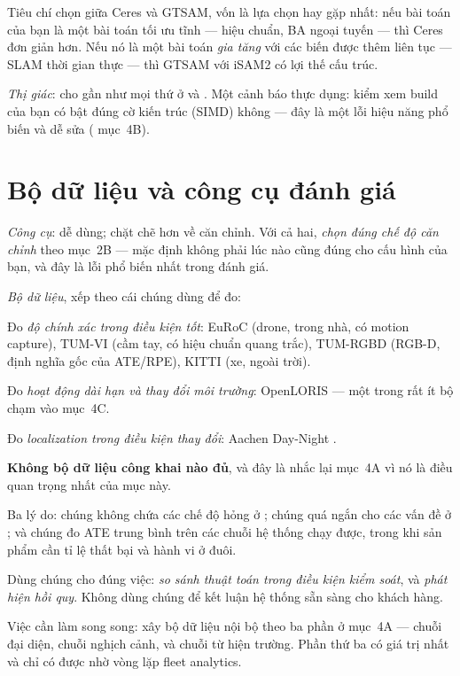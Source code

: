 \documentclass[../../vslam.tex]{subfiles}
\begin{document}
Tiêu chí chọn giữa Ceres và GTSAM, vốn là lựa chọn hay gặp nhất: nếu bài toán của bạn là một bài toán tối ưu tĩnh --- hiệu chuẩn, BA ngoại tuyến --- thì Ceres đơn giản hơn. Nếu nó là một bài toán \emph{gia tăng} với các biến được thêm liên tục --- SLAM thời gian thực --- thì GTSAM với iSAM2 có lợi thế cấu trúc.

\emph{Thị giác}:  cho gần như mọi thứ ở  và . Một cảnh báo thực dụng: kiểm xem build của bạn có bật đúng cờ kiến trúc (SIMD) không --- đây là một lỗi hiệu năng phổ biến và dễ sửa ( mục~4B).

\section{Bộ dữ liệu và công cụ đánh giá}

\emph{Công cụ}:  dễ dùng;  \cite{zhang2018trajeval} chặt chẽ hơn về căn chỉnh. Với cả hai, \emph{chọn đúng chế độ căn chỉnh} theo  mục~2B --- mặc định không phải lúc nào cũng đúng cho cấu hình của bạn, và đây là lỗi phổ biến nhất trong đánh giá.

\emph{Bộ dữ liệu}, xếp theo cái chúng dùng để đo:

Đo \emph{độ chính xác trong điều kiện tốt}: EuRoC \cite{burri2016euroc} (drone, trong nhà, có motion capture), TUM-VI \cite{schubert2018tumvi} (cầm tay, có hiệu chuẩn quang trắc), TUM-RGBD \cite{sturm2012tumrgbd} (RGB-D, định nghĩa gốc của ATE/RPE), KITTI \cite{geiger2012kitti} (xe, ngoài trời).

Đo \emph{hoạt động dài hạn và thay đổi môi trường}: OpenLORIS \cite{shi2020openloris} --- một trong rất ít bộ chạm vào  mục~4C.

Đo \emph{localization trong điều kiện thay đổi}: Aachen Day-Night \cite{sattler2018benchmarking}.

\begin{cannho}
\textbf{Không bộ dữ liệu công khai nào đủ}, và đây là nhắc lại  mục~4A vì nó là điều quan trọng nhất của mục này.

Ba lý do: chúng không chứa các chế độ hỏng ở ; chúng quá ngắn cho các vấn đề ở ; và chúng đo ATE trung bình trên các chuỗi hệ thống chạy được, trong khi sản phẩm cần tỉ lệ thất bại và hành vi ở đuôi.

Dùng chúng cho đúng việc: \emph{so sánh thuật toán trong điều kiện kiểm soát}, và \emph{phát hiện hồi quy}. Không dùng chúng để kết luận hệ thống sẵn sàng cho khách hàng.

Việc cần làm song song: xây bộ dữ liệu nội bộ theo ba phần ở  mục~4A --- chuỗi đại diện, chuỗi nghịch cảnh, và chuỗi từ hiện trường. Phần thứ ba có giá trị nhất và chỉ có được nhờ vòng lặp fleet analytics.
\end{cannho}
\end{document}

